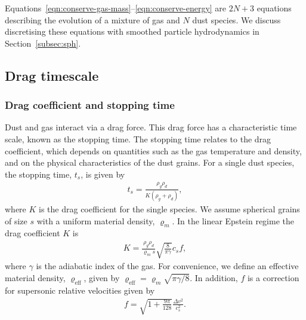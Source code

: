\documentclass[fleqn,usenatbib]{mnras}
\begin{document}
Equations~\ref{eqn:conserve-gas-mass}--\ref{eqn:conserve-energy} are \(2N + 3\)
equations describing the evolution of a mixture of gas and \(N\) dust species.
We discuss discretising these equations with smoothed particle hydrodynamics in
Section~\ref{subsec:sph}.

\subsection{Drag timescale}

\subsubsection{Drag coefficient and stopping time}

Dust and gas interact via a drag force. This drag force has a characteristic
time scale, known as the stopping time. The stopping time relates to the drag
coefficient, which depends on quantities such as the gas temperature and
density, and on the physical characteristics of the dust grains. For a single
dust species, the stopping time, \(t_s\), is given by
%
\begin{align}
   \label{eqn:single-stopping-time}
   t_s = \frac{\rho_g \rho_d}{K (\rho_g + \rho_d)},
\end{align}
%
where \(K\) is the drag coefficient for the single species. We assume spherical
grains of size \(s\) with a uniform material density, \(\varrho_m\). In the
linear Epstein regime \citep{Epstein1924PhRv...23..710E} the drag coefficient
\(K\) is
%
\begin{align}
   \label{eqn:single-drag-coefficient}
   K = \frac{\rho_g \rho_d}{\varrho_m s} \sqrt{\frac{8}{\pi\gamma}} c_s f,
\end{align}
%
where \(\gamma\) is the adiabatic index of the gas. For convenience, we define
an effective material density, \(\varrho_{\mathrm{eff}}\), given by
\(\varrho_{\mathrm{eff}} = \varrho_m \sqrt{\pi\gamma/8}\). In addition, \(f\) is
a correction for supersonic relative velocities given by
\citep{Kwok1975ApJ...198..583K}
%
\begin{align}
   \label{eqn:supersonic}
   f = \sqrt{1 + \frac{9\pi}{128}} \frac{\Delta v^2}{c_s^2}.
\end{align}
%
\end{document}
